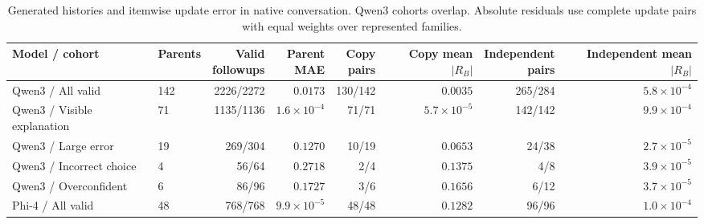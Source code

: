 \begin{table}[t]
\centering
{\small\setlength{\tabcolsep}{4pt}
\begin{tabular*}{\textwidth}{@{\extracolsep{\fill}}llrrrrrr@{}}
\toprule
Model / cohort & Parents & \shortstack{Valid\\followups} & \shortstack{Parent\\MAE} & \shortstack{Copy\\pairs} & \shortstack{Copy\\mean $|R_B|$} & \shortstack{Independent\\pairs} & \shortstack{Independent\\mean $|R_B|$} \\
\midrule
Qwen3 / All valid & 142 & 2226/2272 & $0.0173$ & 130/142 & $0.0035$ & 265/284 & $5.8\times10^{-4}$ \\
Qwen3 / Visible explanation & 71 & 1135/1136 & $1.6\times10^{-4}$ & 71/71 & $5.7\times10^{-5}$ & 142/142 & $9.9\times10^{-4}$ \\
Qwen3 / Large error & 19 & 269/304 & $0.1270$ & 10/19 & $0.0653$ & 24/38 & $2.7\times10^{-5}$ \\
Qwen3 / Incorrect choice & 4 & 56/64 & $0.2718$ & 2/4 & $0.1375$ & 4/8 & $3.9\times10^{-5}$ \\
Qwen3 / Overconfident & 6 & 86/96 & $0.1727$ & 3/6 & $0.1656$ & 6/12 & $3.7\times10^{-5}$ \\
Phi-4 / All valid & 48 & 768/768 & $9.9\times10^{-5}$ & 48/48 & $0.1282$ & 96/96 & $1.0\times10^{-4}$ \\
\bottomrule
\end{tabular*}
}
\caption{Generated histories and itemwise update error in native conversation. Qwen3 cohorts overlap. Absolute residuals use complete update pairs with equal weights over represented families.}
\label{tab:review-history}
\end{table}
